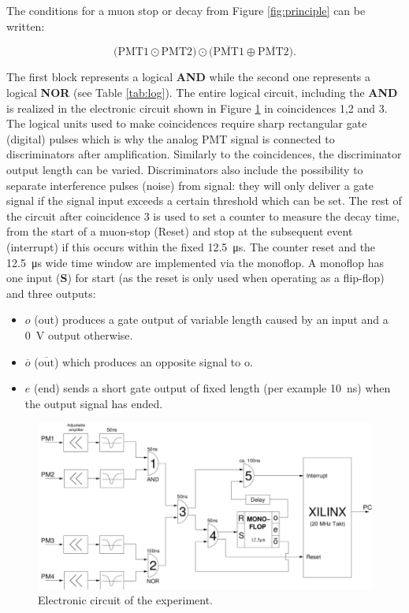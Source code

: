 The conditions for a muon stop or decay from Figure \ref{fig:principle} can be written:

\begin{equation}
\big(\text{PMT}1 \odot \text{PMT}2\big) \odot \big(\overline{\text{PMT}1} \oplus \overline{\text{PMT}2}\big).
\end{equation}

The first block represents a logical \textbf{AND} while the second one represents a logical \textbf{NOR} (see Table \ref{tab:log}). The entire logical circuit, including the \textbf{AND} is realized in the electronic circuit shown in Figure \ref{fig:elek} in coincidences 1,2 and 3. The logical units used to make coincidences require sharp rectangular gate (digital) pulses which is why the analog PMT signal is connected to discriminators after amplification. Similarly to the coincidences, the discriminator output length can be varied. Discriminators also include the possibility to separate interference pulses (noise) from signal: they will only deliver a gate signal if the signal input exceeds a certain threshold which can be set. The rest of the circuit after coincidence 3 is used to set a counter to measure the decay time, from the start of a muon-stop (Reset) and stop at the subsequent event (interrupt) if this occurs within the fixed \SI{12.5}{\micro\second}. The counter reset and the \SI{12.5}{\micro\second} wide time window are implemented via the monoflop. A monoflop has one input (\textbf{S}) for start (as the reset is only used when operating as a flip-flop) and three outputs:

\begin{itemize}
\item $o$ (out) produces a gate output of variable length caused by an input and a \SI{0}{\volt} output otherwise.
\item $\overline{o}$ ($\overline{\text{out}}$) which produces an opposite signal to o.
\item $e$ (end) sends a short gate output of fixed length (per example \SI{10}{\nano\second}) when the output signal has ended.
\end{itemize}

\begin{figure}[htbp]
\centering
\includegraphics[width=0.7\linewidth]{./fig/electronicc.png}
\caption{Electronic circuit of the experiment.}
\label{fig:elek}
\end{figure}

